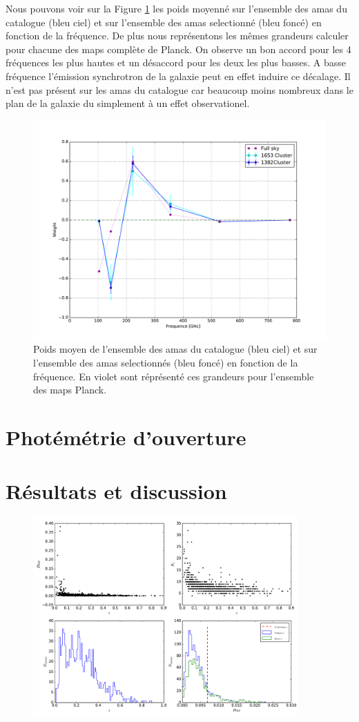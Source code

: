 \documentclass[a4paper,11pt]{article}
\begin{document}
Nous pouvons voir sur la Figure \ref{w_full} les poids moyenné sur
l'ensemble des amas du catalogue (bleu ciel) et sur l'ensemble des
amas selectionné (bleu foncé) en fonction de la fréquence. De plus
nous représentons les mêmes grandeurs calculer pour chacune des maps
complète de Planck. On observe un bon accord pour les 4 fréquences les
plus hautes et un désaccord pour les deux les plus basses. A basse
fréquence l'émission synchrotron de la galaxie peut en effet induire
ce décalage. Il n'est pas présent sur les amas du catalogue car
beaucoup moins nombreux dans le plan de la galaxie du simplement à un
effet observationel. 

\begin{figure}[h!]
  \centering
  \label{w_full}
  \includegraphics[width=4.6in]{w_full.pdf}
  \caption{Poids moyen de l'ensemble des amas du catalogue (bleu ciel) et sur
    l'ensemble des amas selectionnés (bleu foncé) en fonction
    de la fréquence. En violet sont réprésenté ces grandeurs pour
    l'ensemble des maps Planck.}
\end{figure}
  

\section{Photémétrie d'ouverture}
\section{Résultats et discussion}

\begin{figure}[h!]
  \centering
  \label{rslt_1}
  \includegraphics[width=4in]{rslt_1.pdf}
  \caption{}
\end{figure}
\end{document}
